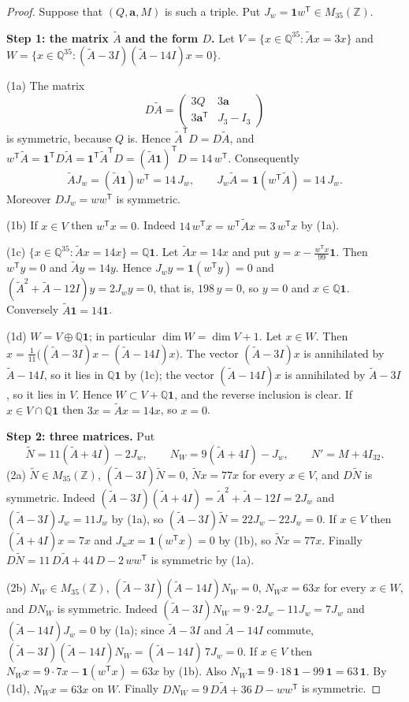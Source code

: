 \documentclass[11pt,a4paper]{article}
\theoremstyle{remark}
\newcommand{\ZZ}{\mathbb{Z}}
\newcommand{\QQ}{\mathbb{Q}}
\newcommand{\one}{\mathbf{1}}
\newcommand{\tp}{\mathsf{T}}
\newcommand{\av}{\mathbf{a}}
\newcommand{\tA}{\widetilde{A}}
\newcommand{\tN}{\widetilde{N}}
\newcommand{\Jw}{J_w}
\begin{document}
\begin{proof}
Suppose that $(Q,\av,M)$ is such a triple. Put $\Jw=\one w^{\tp}\in M_{35}(\ZZ)$.

\medskip\noindent\textbf{Step 1: the matrix $\tA$ and the form $D$.}
Let $V=\{x\in\QQ^{35}:\tA x=3x\}$ and $W=\{x\in\QQ^{35}:(\tA-3I)(\tA-14I)x=0\}$.

\smallskip\noindent(1a) The matrix
\[
D\tA=\begin{pmatrix}3Q&3\av\\ 3\av^{\tp}&J_3-I_3\end{pmatrix}
\]
is symmetric, because $Q$ is. Hence $\tA^{\tp}D=D\tA$, and
$w^{\tp}\tA=\one^{\tp}D\tA=\one^{\tp}\tA^{\tp}D=(\tA\one)^{\tp}D=14\,w^{\tp}$. Consequently
\[
\tA\Jw=(\tA\one)w^{\tp}=14\,\Jw,\qquad \Jw\tA=\one(w^{\tp}\tA)=14\,\Jw .
\]
Moreover $D\Jw=ww^{\tp}$ is symmetric.

\smallskip\noindent(1b) If $x\in V$ then $w^{\tp}x=0$. Indeed $14\,w^{\tp}x=w^{\tp}\tA x=3\,w^{\tp}x$ by (1a).

\smallskip\noindent(1c) $\{x\in\QQ^{35}:\tA x=14x\}=\QQ\one$. Let $\tA x=14x$ and put
$y=x-\frac{w^{\tp}x}{99}\one$. Then $w^{\tp}y=0$ and $\tA y=14y$. Hence $\Jw y=\one(w^{\tp}y)=0$ and
$(\tA^2+\tA-12I)y=2\Jw y=0$, that is, $198\,y=0$, so $y=0$ and $x\in\QQ\one$. Conversely $\tA\one=14\one$.

\smallskip\noindent(1d) $W=V\oplus\QQ\one$; in particular $\dim W=\dim V+1$. Let $x\in W$. Then
$x=\frac1{11}\bigl((\tA-3I)x-(\tA-14I)x\bigr)$. The vector $(\tA-3I)x$ is annihilated by $\tA-14I$, so it lies in
$\QQ\one$ by (1c); the vector $(\tA-14I)x$ is annihilated by $\tA-3I$, so it lies in $V$. Hence
$W\subset V+\QQ\one$, and the reverse inclusion is clear. If $x\in V\cap\QQ\one$ then $3x=\tA x=14x$, so $x=0$.

\medskip\noindent\textbf{Step 2: three matrices.}
Put
\[
\tN=11(\tA+4I)-2\Jw,\qquad N_W=9(\tA+4I)-\Jw,\qquad N'=M+4I_{32}.
\]
\noindent(2a) $\tN\in M_{35}(\ZZ)$, $(\tA-3I)\tN=0$, $\tN x=77x$ for every $x\in V$, and $D\tN$ is symmetric. Indeed
$(\tA-3I)(\tA+4I)=\tA^2+\tA-12I=2\Jw$ and $(\tA-3I)\Jw=11\Jw$ by (1a), so $(\tA-3I)\tN=22\Jw-22\Jw=0$. If $x\in V$
then $(\tA+4I)x=7x$ and $\Jw x=\one(w^{\tp}x)=0$ by (1b), so $\tN x=77x$. Finally
$D\tN=11\,D\tA+44\,D-2\,ww^{\tp}$ is symmetric by (1a).

\smallskip\noindent(2b) $N_W\in M_{35}(\ZZ)$, $(\tA-3I)(\tA-14I)N_W=0$, $N_Wx=63x$ for every $x\in W$, and $DN_W$ is
symmetric. Indeed $(\tA-3I)N_W=9\cdot2\Jw-11\Jw=7\Jw$ and $(\tA-14I)\Jw=0$ by (1a); since $\tA-3I$ and $\tA-14I$
commute, $(\tA-3I)(\tA-14I)N_W=(\tA-14I)\,7\Jw=0$. If $x\in V$ then $N_Wx=9\cdot7x-\one(w^{\tp}x)=63x$ by (1b). Also
$N_W\one=9\cdot18\,\one-99\,\one=63\,\one$. By (1d), $N_Wx=63x$ on $W$. Finally $DN_W=9\,D\tA+36\,D-ww^{\tp}$ is
symmetric.


\end{proof}
\end{document}
